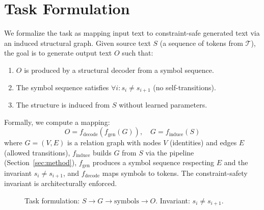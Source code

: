 \documentclass[10pt]{article}
\begin{document}
\section{Task Formulation}
\label{sec:task}

We formalize the task as mapping input text to constraint-safe generated text via an induced structural graph. Given source text $S$ (a sequence of tokens from $\mathcal{T}$), the goal is to generate output text $O$ such that:
\begin{enumerate}
\item $O$ is produced by a structural decoder from a symbol sequence.
\item The symbol sequence satisfies $\forall i: s_i \neq s_{i+1}$ (no self-transitions).
\item The structure is induced from $S$ without learned parameters.
\end{enumerate}

Formally, we compute a mapping:
\begin{equation}
O = f_{\text{decode}}(f_{\text{gen}}(G)), \quad G = f_{\text{induce}}(S)
\end{equation}
where $G = (V, E)$ is a relation graph with nodes $V$ (identities) and edges $E$ (allowed transitions), $f_{\text{induce}}$ builds $G$ from $S$ via the pipeline (Section~\ref{sec:method}), $f_{\text{gen}}$ produces a symbol sequence respecting $E$ and the invariant $s_i \neq s_{i+1}$, and $f_{\text{decode}}$ maps symbols to tokens. The constraint-safety invariant is architecturally enforced.

\begin{figure}[t]
\centering
{}
\caption{Task formulation: $S \rightarrow G \rightarrow \text{symbols} \rightarrow O$. Invariant: $s_i \neq s_{i+1}$.}
\label{fig:task}
\end{figure}
\end{document}

